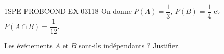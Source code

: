 \begin{exercice}{1SPE-PROBCOND-EX-031}{1}{8}
On donne $P(A) = \dfrac{1}{3}$, $P(B) = \dfrac{1}{4}$ et $P(A \cap B) = \dfrac{1}{12}$.

Les événements $A$ et $B$ sont-ils indépendants ? Justifier.
\end{exercice}
